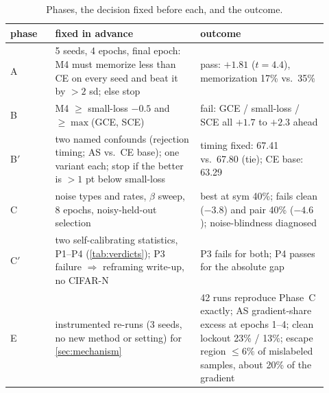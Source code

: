 \begin{table}[h]
\centering
\caption{Phases, the decision fixed before each, and the outcome.}
\label{tab:phases}
\small
\begin{tabular}{p{0.13\linewidth}p{0.42\linewidth}p{0.37\linewidth}}
\toprule
phase & fixed in advance & outcome \\
\midrule
A & 5 seeds, 4 epochs, final epoch: M4 must memorize less than CE on every seed and beat it by
$> 2$ sd; else stop & pass: $+1.81$ ($t = 4.4$), memorization 17\% vs.\ 35\% \\
B & M4 $\ge$ small-loss $- 0.5$ and $\ge \max$(GCE, SCE) & fail: GCE / small-loss / SCE all
$+1.7$ to $+2.3$ ahead \\
B$'$ & two named confounds (rejection timing; AS vs.\ CE base); one variant each; stop if the
better is $> 1$ pt below small-loss & timing fixed: 67.41 vs.\ 67.80 (tie); CE base: 63.29 \\
C & noise types and rates, $\beta$ sweep, 8 epochs, noisy-held-out selection & best at sym 40\%;
fails clean ($-3.8$) and pair 40\% ($-4.6$); noise-blindness diagnosed \\
C$'$ & two self-calibrating statistics, P1--P4 (\cref{tab:verdicts}); P3 failure $\Rightarrow$
reframing write-up, no CIFAR-N & P3 fails for both; P4 passes for the absolute gap \\
E & instrumented re-runs (3 seeds, no new method or setting) for \cref{sec:mechanism} &
42 runs reproduce Phase~C exactly; AS gradient-share excess at epochs 1--4; clean lockout 23\% /
13\%; escape region $\le 6\%$ of mislabeled samples, about 20\% of the gradient \\
\bottomrule
\end{tabular}
\end{table}

